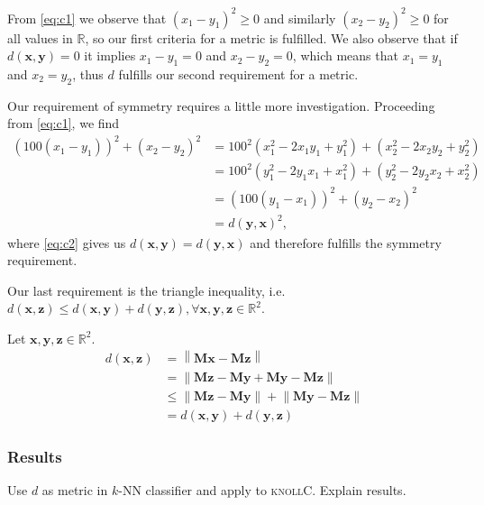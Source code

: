 \documentclass{article}
\newcommand{\vect}[1]{\ensuremath{\boldsymbol{\mathbf{#1}}}\xspace}
\begin{document}
From \eqref{eq:c1} we observe that $(x_1 - y_1)^2 \geq 0$ and
similarly $(x_2 - y_2)^2 \geq 0$ for all values in $\mathbb{R}$, so
our first criteria for a metric is fulfilled. We also observe that if
$d(\vect{x},\vect{y}) = 0$ it implies $x_1 - y_1 = 0$ and $x_2 - y_2 =
0$, which means that $x_1 = y_1$ and $x_2 = y_2$, thus $d$ fulfills
our second requirement for a metric.

Our requirement of symmetry requires a little more
investigation. Proceeding from \eqref{eq:c1}, we find
\begin{align}
\nonumber (100(x_1 - y_1))^2 + (x_2 - y_2)^2 &= 100^2(x_1^2 - 2x_1y_1 + y_1^2) + (x_2^2 - 2x_2y_2 + y_2^2)\\
  \nonumber &= 100^2(y_1^2 - 2y_1x_1 + x_1^2) + (y_2^2 - 2y_2x_2 + x_2^2)\\
  \nonumber &= (100(y_1 - x_1))^2 + (y_2 - x_2)^2\\
  &= d(\vect{y},\vect{x})^2\label{eq:c2},
\end{align}
where \eqref{eq:c2} gives us $d(\vect{x},\vect{y}) =
d(\vect{y},\vect{x})$ and therefore fulfills the symmetry
requirement.

Our last requirement is the triangle inequality, i.e.\ $d(\vect{x},\vect{z}) \leq d(\vect{x},\vect{y}) + d(\vect{y},\vect{z}), \forall \vect{x},\vect{y},\vect{z}\in \mathbb{R}^2$.

Let $\vect{x},\vect{y},\vect{z}\in\mathbb{R}^2$.
\begin{align}
  d(\vect{x},\vect{z}) &= \left\|\vect{M}\vect{x} - \vect{M}\vect{z}\right\|\\
  &= \left\|\vect{M}\vect{z} - \vect{M}\vect{y} + \vect{M}\vect{y} - \vect{M}\vect{z}\right\|\\
  &\leq \left\|\vect{M}\vect{z} - \vect{M}\vect{y}\right\| + \left\|\vect{M}\vect{y} - \vect{M}\vect{z}\right\|\\
  &= d(\vect{x},\vect{y}) + d(\vect{y},\vect{z})
\end{align}

\subsubsection{Results}
Use $d$ as metric in $k$-NN classifier and apply to
\textsc{knollC}. Explain results.
\end{document}
